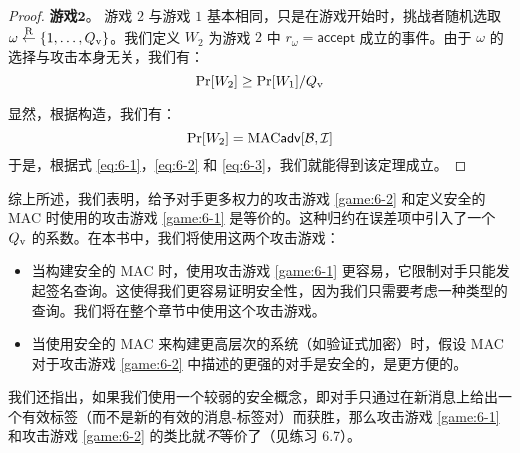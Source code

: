 \begin{proof}
\vspace{5pt}

\noindent\textbf{游戏$\mathbf{2}$}。
游戏 $2$ 与游戏 $1$ 基本相同，只是在游戏开始时，挑战者随机选取 $\omega\overset{\rm R}\leftarrow\{1,\dots,Q_{\rm v}\}$。我们定义 $W_2$ 为游戏 $2$ 中 $r_\omega=\mathsf{accept}$ 成立的事件。由于 $\omega$ 的选择与攻击本身无关，我们有：
\begin{equation}\label{eq:6-3}
\Pr[W_2]\geq{\Pr[W_1]}/{Q_{\rm v}}
\end{equation}

显然，根据构造，我们有：
\begin{equation}\label{eq:6-4}
\Pr[W_2]={\rm MAC}\mathsf{adv}[\mathcal{B},\mathcal{I}]
\end{equation}
于是，根据式 \ref{eq:6-1}，\ref{eq:6-2} 和 \ref{eq:6-3}，我们就能得到该定理成立。
\end{proof}

综上所述，我们表明，给予对手更多权力的攻击游戏 \ref{game:6-2} 和定义安全的 MAC 时使用的攻击游戏 \ref{game:6-1} 是等价的。这种归约在误差项中引入了一个 $Q_{\rm v}$ 的系数。在本书中，我们将使用这两个攻击游戏：
\begin{itemize}
	\item 当构建安全的 MAC 时，使用攻击游戏 \ref{game:6-1} 更容易，它限制对手只能发起签名查询。这使得我们更容易证明安全性，因为我们只需要考虑一种类型的查询。我们将在整个章节中使用这个攻击游戏。
	\item 当使用安全的 MAC 来构建更高层次的系统（如验证式加密）时，假设 MAC 对于攻击游戏 \ref{game:6-2} 中描述的更强的对手是安全的，是更方便的。
\end{itemize}

我们还指出，如果我们使用一个较弱的安全概念，即对手只通过在新消息上给出一个有效标签（而不是新的有效的消息-标签对）而获胜，那么攻击游戏 \ref{game:6-1} 和攻击游戏 \ref{game:6-2} 的类比就\emph{不}等价了（见练习 6.7）。